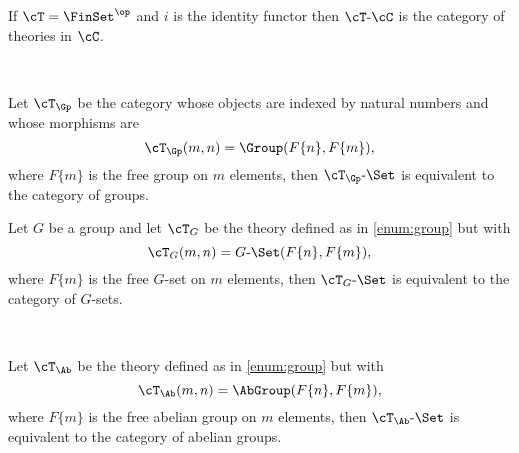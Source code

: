\documentclass[leqno,oneside,english]{elsarticle}
\newcounter{enumisaved}
\newlength{\thmsaved}
\newlength{\thmnow}
\begin{document}
  \begin{example}\label{ex:theories}\ 
    \begin{enumerate}
      {
  {\ifshowcomplete
{\item[]}
\fi}
  {    {}  \ifshowcomplete
  \ 
  {
    \item If $\cT=\FinSet^{\op}$ and $i$ is the identity functor then
         ${{\cT}\text{-}{\cC}}$ is the category of theories in $\cC$.}
  {\setlength{\thmnow}{{\thethm}pt}}
  \ 
  \ifthenelse{\lengthtest{\thmnow > \thmsaved}}{
    
    \setcounter{thm}{{\strip@pt{\thmsaved}}}  
  }{
    
  }
  \setcounter{enumi}{\theenumisaved}
    \else  \fi
}
}{}
      
    \item \label{enum:group} Let $\cT_{\Gp}$ be the category whose objects
      are indexed by natural numbers and whose morphisms are
      \[
      \cT_{\Gp}(m,n)=\Group(F\{n\},F\{m\}),
      \] 
      where $F\{m\}$ is the free group on $m$ elements, then ${{\cT_{\Gp}}\text{-}{\Set}}$ is equivalent to the category of groups.

    \item Let $G$ be a group and let $\cT_{G}$ be the theory defined
      as in \eqref{enum:group} but with
      \[
      \cT_{G}(m,n)=G\text{-}\Set(F\{n\},F\{m\}), 
      \] 
      where $F\{m\}$ is the free $G$-set on $m$ elements, then
      ${{\cT_{G}}\text{-}{\Set}}$ is equivalent to the category of $G$-sets.
      
    {{    {}  \ifshowcomplete
  \ 
  {
    \item Let $\cT_{\Ab}$ be the theory defined as in \eqref{enum:group}
      but with 
      \[
      \cT_{\Ab}(m,n)=\AbGroup(F\{n\},F\{m\}),
      \]
      where $F\{m\}$ is the free abelian group on $m$ elements, then
      ${{\cT_{\Ab}}\text{-}{\Set}}$ is equivalent to the category of abelian groups.
    
}
  {}
  \ 
  \ifthenelse{\lengthtest{\thmnow > \thmsaved}}{
    
}}}
\end{enumerate}
\end{example}
\end{document}
